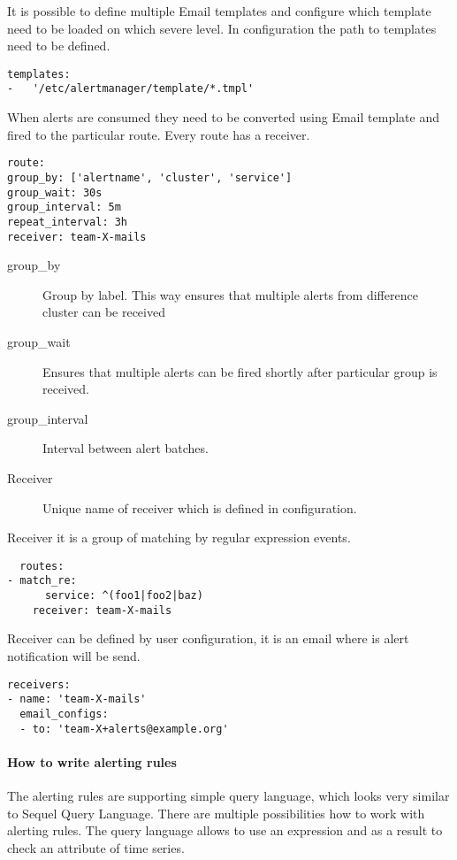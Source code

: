 It is possible to define multiple Email templates and configure which template need to be loaded on which severe level. In configuration the path to templates need to be defined. 

 \begin{lstlisting}
templates: 
-	'/etc/alertmanager/template/*.tmpl'
\end{lstlisting}

When alerts are consumed they need to be converted using Email template and fired to the particular route. Every route has a receiver. 

 \begin{lstlisting}
route:
group_by: ['alertname', 'cluster', 'service']
group_wait: 30s
group_interval: 5m
repeat_interval: 3h 
receiver: team-X-mails
\end{lstlisting}

\begin{description}
\item[group\_by] Group by label. This way ensures that multiple alerts from difference cluster can be received
\item[group\_wait] Ensures that multiple alerts can be fired shortly after particular group is received.
\item[group\_interval] Interval between alert batches.
\item[Receiver] Unique name of receiver which is defined in configuration. 
\end{description}

Receiver it is a group of matching by regular expression events.

 \begin{lstlisting}
  routes:
- match_re:
      service: ^(foo1|foo2|baz)
    receiver: team-X-mails
\end{lstlisting}

Receiver can be defined by user configuration, it is an email where is alert notification will be send.

 \begin{lstlisting}
receivers:
- name: 'team-X-mails'
  email_configs:
  - to: 'team-X+alerts@example.org'
\end{lstlisting}

\paragraph{How to write alerting rules} 

The alerting rules are supporting simple query language, which looks very similar to Sequel Query Language.  
There are multiple possibilities how to work with alerting rules. The query language allows to use an expression and as a result to check an attribute of time series. 

